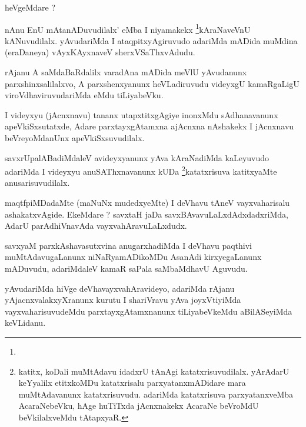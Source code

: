 \begin{artha}
heVgeMdare ?
\end{artha}

\begin{artha}
nAnu EnU mAtanADuvudilalx' eMba I niyamakekx \footnote{}kAraNaveVnU kANuvudilalx. yAvudariMda I ataqpitxyAgiruvudo adariMda mADida muMdina (eraDaneya) vAyxKAyxnaveV sherxVSaThxvAdudu.
\end{artha}


\begin{artha}
rAjanu A saMdaBaRdalilx varadAna mADida meVlU yAvudanunx parxshinxsalilalxvo, A parxshenxyanunx heVLadiruvudu videyxgU kamaRgaLigU viroVdhaviruvudariMda eMdu tiLiyabeVku.
\end{artha}

\begin{artha}
I videyxyu (jAcnxnavu) tananx utapxtitxgAgiye inonxMdu sAdhanavanunx apeVkiSxsutatxde, Adare parxtayxgAtamxna ajAcnxna nAshakekx I jAcnxnavu beVreyoMdanUnx apeVkiSxsuvudilalx.
\end{artha}

\begin{artha}
savxrUpalABadiMdaleV avideyxyanunx yAva kAraNadiMda kaLeyuvudo adariMda I videyxyu anuSAThxnavanunx kUDa \footnote{katitx, koDali muMtAdavu idadxrU tAnAgi katatxrisuvudilalx. yArAdarU keYyalilx etitxkoMDu katatxrisalu parxyatanxmADidare mara muMtAdavanunx katatxrisuvudu. adariMda katatxrisuva parxyatanxveMba AcaraNebeVku, hAge huTiTxda jAcnxnakekx AcaraNe beVroMdU beVkilalxveMdu tAtapxyaR.}katatxrisuva katitxyaMte anusarisuvudilalx.
\end{artha}


\begin{artha}
maqtfpiMDadaMte (maNuNx mudedxyeMte) I deVhavu tAneV vayxvaharisalu ashakatxvAgide. EkeMdare ? savxtaH jaDa savxBAvavuLaLxdAdxdadxriMda, AdarU parAdhiVnavAda vayxvahAravuLaLxdudx.
\end{artha}

\begin{artha}
savxyaM parxkAshavasutxvina anugarxhadiMda I deVhavu paqthivi muMtAdavugaLanunx niNaRyamADikoMDu AsanAdi kirxyegaLanunx mADuvudu, adariMdaleV kamaR saPala saMbaMdhavU Aguvudu.
\end{artha}

\begin{artha}
yAvudariMda hiVge deVhavayxvahAravideyo, adariMda rAjanu yAjacnxvalakxyXranunx kurutu I shariVravu yAva joyxVtiyiMda vayxvaharisuvudeMdu parxtayxgAtamxnanunx tiLiyabeVkeMdu aBilASeyiMda keVLidanu.
\end{artha}

